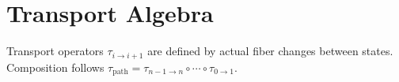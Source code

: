 \section{Transport Algebra}
\label{app:transport}


Transport operators $\tau_{i \to i+1}$ are defined by actual fiber changes between states.
Composition follows $\tau_{\text{path}} = \tau_{n-1 \to n} \circ \cdots \circ \tau_{0 \to 1}$.
